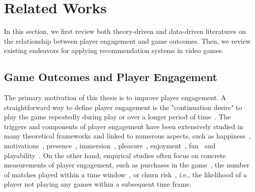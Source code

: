 \chapter{Related Works} %

\label{chapter:relatework} %

In this section, we first review both theory-driven and data-driven literatures on the relationship between player engagement and game outcomes. Then, we review existing endeavors for applying recommendation systems in video games.

\section{Game Outcomes and Player Engagement}
The primary motivation of this thesis is to improve player engagement. A straightforward way to define player engagement is the "continuation desire" to play the game repeatedly during play or over a longer period of time~\cite{schoenau2011player}. The triggers and components of player engagement have been extensively studied in many theoretical frameworks and linked to numerous aspects, such as happiness~\cite{sweetser2005gameflow,flow1990psychology,chen2007flow}, motivations~\cite{przybylski2010motivational,ryan2006motivational,yee2006demographics,yee2006motivations,sherry2006video}, presence~\cite{lombard1997heart,tamborini2006role}, immersion~\cite{mcmahan2003immersion,brown2004grounded,jennett2008measuring,ermi2005fundamental}, pleasure~\cite{costello2009tool}, enjoyment~\cite{ravaja2007fun,klimmt2003dimensions,mekler2014systematic}, fun~\cite{koster2013theory} and playability~\cite{federoff2003improving,federoff2002heuristics,desurvire2004using,nacke2009playability}. On the other hand, empirical studies often focus on concrete measurements of player engagement, such as purchases in the game~\cite{xie2015predicting,sifa2015predicting}, the number of matches played within a time window~\cite{xue2017dynamic,weber2011modeling,}, or churn risk~\cite{hadiji2014predicting,harrison2012players}, i.e., the likelihood of a player not playing any games within a subsequent time frame.

